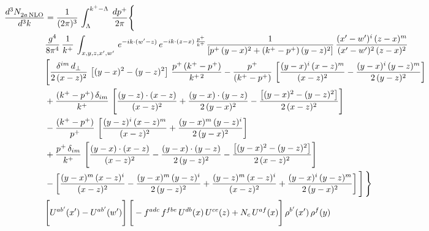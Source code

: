 \documentclass[9pt]{article}
\numberwithin{equation}{section}
\begin{document}
\begin{align}
    \frac{d^{3}N_{2a\,\rm NLO}^{\rm}}{d^{3}k}  & =  \frac{1}{(2\pi)^{3}}\,\int_{\Lambda}^{k^{+}-\Lambda}\, \frac{dp^{+}}{2\pi}\Bigg\{\notag \\ & \frac{g^{4}}{8\pi^{4}}\,\frac{1}{k^{+}}\, \int_{x,y,z,x',w'}\,e^{-ik\cdot(w'-z)}\,e^{-ik\cdot (z-x)\,\frac{p^{+}}{k^{+}}}\frac{1}{\left[p^{+}\,(y-x)^{2}+(k^{+}-p^{+})\,(y-z)^{2}\right]}\, \frac{(x'-w')^{i}\,(z-x)^{m}}{(x'-w')^{2}\,(z-x)^{2}} \notag \\ & \Bigg[\frac{\delta^{im}\,d_{\perp}}{2\,(x-z)^{2}}\,\left[(y-x)^{2}-(y-z)^{2}\right]\,\frac{p^{+}\,(k^{+}-p^{+})}{k^{+\,2}}-\frac{p^{+}}{(k^{+}-p^{+})}\,\left[\frac{(y-x)^{i}\,(x-z)^{m}}{(x-z)^{2}}-\frac{(y-x)^{i}\,(y-z)^{m}}{2\,(y-z)^{2}}\right]\notag \\ & +\frac{(k^{+}-p^{+})\,\delta_{im}}{k^{+}}\,\left[\frac{(y-z)\cdot (x-z)}{(x-z)^{2}}+\frac{(y-x)\cdot (y-z)}{2\,(y-x)^{2}}-\frac{\left[(y-x)^{2}-(y-z)^{2}\right]}{2\,(x-z)^{2}}\right]\notag \\ & -\frac{(k^{+}-p^{+})}{p^{+}}\,\left[\frac{(y-z)^{i}\,(x-z)^{m}}{(x-z)^{2}}+\frac{(y-x)^{m}\,(y-z)^{i}}{2\,(y-x)^{2}}\right]\notag \\ & +\frac{p^{+}\,\delta_{im}}{k^{+}}\,\left[\frac{(y-x)\cdot (x-z)}{(x-z)^{2}}-\frac{(y-x)\cdot (y-z)}{2\,(y-z)^{2}}-\frac{\left[(y-x)^{2}-(y-z)^{2}\right]}{2\,(x-z)^{2}}\right]\notag \\ &-\left[\frac{(y-x)^{m}\,(x-z)^{i}}{(x-z)^{2}}-\frac{(y-x)^{m}\,(y-z)^{i}}{2\,(y-z)^{2}}+\frac{(y-z)^{m}\,(x-z)^{i}}{(x-z)^{2}}+\frac{(y-x)^{i}\,(y-z)^{m}}{2\,(y-x)^{2}}\right]\Bigg]\,\Bigg\} \notag \\ & \Bigg[U^{ab'}(x')-U^{ab'}(w')\Bigg]\,\Bigg[-f^{adc}\,f^{fbe}\,U^{db}(x)\,U^{ce}(z)+N_{c}\,U^{af}(x)\Bigg]\,\rho^{b'}(x')\,\rho^{f}(y)
\end{align}
\end{document}
